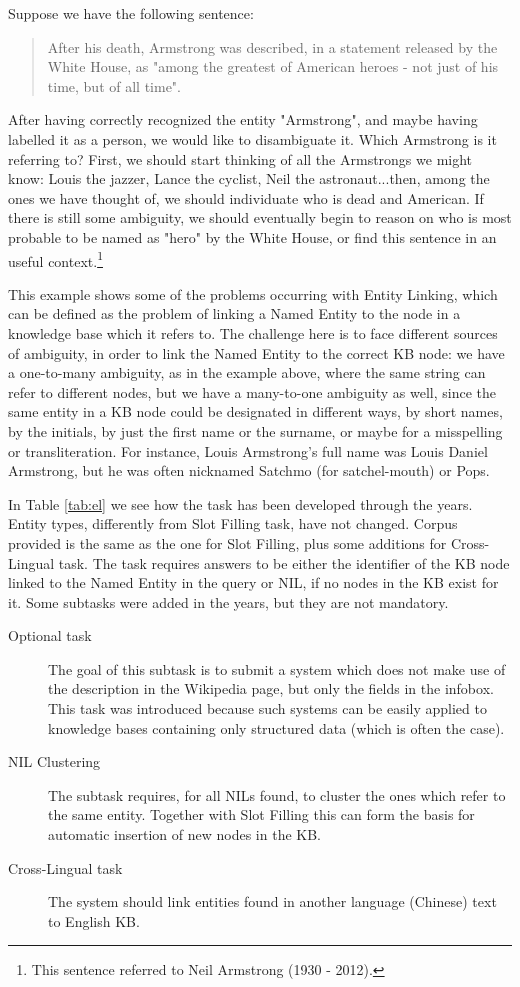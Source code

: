 \documentclass[a4paper,11pt]{report}
\begin{document}
Suppose we have the following sentence:
\begin{quote}
After his death, Armstrong was described, in a statement released by the White House, as "among the greatest of American heroes - not just of his time, but of all time".
\end{quote}

After having correctly recognized the entity "Armstrong", and maybe having labelled it as a person, we would like to disambiguate it. Which Armstrong is it referring to? First, we should start thinking of all the Armstrongs we might know: Louis the jazzer, Lance the cyclist, Neil the astronaut...then, among the ones we have thought of, we should individuate who is dead and American. If there is still some ambiguity, we should eventually begin to reason on who is most probable to be named as "hero" by the White House, or find this sentence in an useful context.\footnote{This sentence referred to Neil Armstrong (1930 - 2012).}

This example shows some of the problems occurring with Entity Linking, which can be defined as the problem of linking a Named Entity to the node in a knowledge base which it refers to. The challenge here is to face different sources of ambiguity, in order to link the Named Entity to the correct KB node: we have a one-to-many ambiguity, as in the example above, where the same string can refer to different nodes, but we have a many-to-one ambiguity as well, since the same entity in a KB node could be designated in different ways, by short names, by the initials, by just the first name or the surname, or maybe for a misspelling or transliteration. For instance, Louis Armstrong's full name was Louis Daniel Armstrong, but he was often nicknamed Satchmo (for satchel-mouth) or Pops.

In Table \ref{tab:el} we see how the task has been developed through the years. Entity types, differently from Slot Filling task, have not changed. Corpus provided is the same as the one for Slot Filling, plus some additions for Cross-Lingual task. The task requires answers to be either the identifier of the KB node linked to the Named Entity in the query or NIL, if no nodes in the KB exist for it.
Some subtasks were added in the years, but they are not mandatory.
\begin{description}
\item[Optional task] The goal of this subtask is to submit a system which does not make use of the description in the Wikipedia page, but only the fields in the infobox. This task was introduced because such systems can be easily applied to knowledge bases containing only structured data (which is often the case).
\item[NIL Clustering] The subtask requires, for all NILs found, to cluster the ones which refer to the same entity. Together with Slot Filling this can form the basis for automatic insertion of new nodes in the KB.
\item[Cross-Lingual task] The system should link entities found in another language (Chinese) text to English KB.
\end{description}
\end{document}
